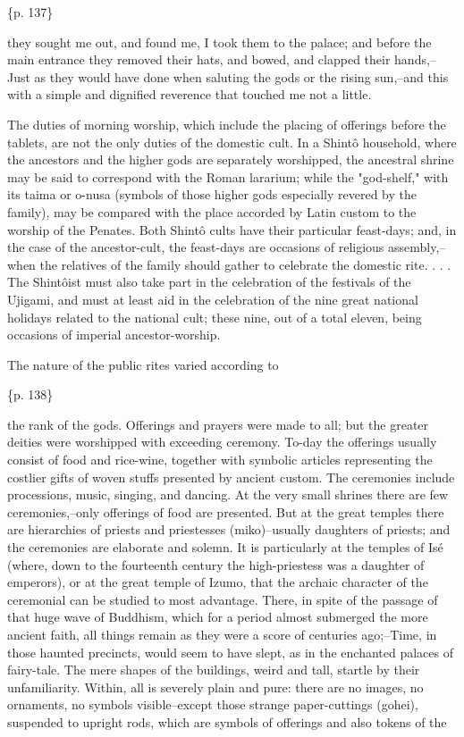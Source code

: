 \{p. 137\}

they sought me out, and found me, I took them to the palace; and before the main entrance they removed their hats, and bowed, and clapped their hands,--Just as they would have done when saluting the gods or the rising sun,--and this with a simple and dignified reverence that touched me not a little.



The duties of morning worship, which include the placing of offerings before the tablets, are not the only duties of the domestic cult. In a Shintô household, where the ancestors and the higher gods are separately worshipped, the ancestral shrine may be said to correspond with the Roman lararium; while the "god-shelf," with its taima or o-nusa (symbols of those higher gods especially revered by the family), may be compared with the place accorded by Latin custom to the worship of the Penates. Both Shintô cults have their particular feast-days; and, in the case of the ancestor-cult, the feast-days are occasions of religious assembly,--when the relatives of the family should gather to celebrate the domestic rite. . . . The Shintôist must also take part in the celebration of the festivals of the Ujigami, and must at least aid in the celebration of the nine great national holidays related to the national cult; these nine, out of a total eleven, being occasions of imperial ancestor-worship.

The nature of the public rites varied according to

\{p. 138\}

the rank of the gods. Offerings and prayers were made to all; but the greater deities were worshipped with exceeding ceremony. To-day the offerings usually consist of food and rice-wine, together with symbolic articles representing the costlier gifts of woven stuffs presented by ancient custom. The ceremonies include processions, music, singing, and dancing. At the very small shrines there are few ceremonies,--only offerings of food are presented. But at the great temples there are hierarchies of priests and priestesses (miko)--usually daughters of priests; and the ceremonies are elaborate and solemn. It is particularly at the temples of Isé (where, down to the fourteenth century the high-priestess was a daughter of emperors), or at the great temple of Izumo, that the archaic character of the ceremonial can be studied to most advantage. There, in spite of the passage of that huge wave of Buddhism, which for a period almost submerged the more ancient faith, all things remain as they were a score of centuries ago;--Time, in those haunted precincts, would seem to have slept, as in the enchanted palaces of fairy-tale. The mere shapes of the buildings, weird and tall, startle by their unfamiliarity. Within, all is severely plain and pure: there are no images, no ornaments, no symbols visible--except those strange paper-cuttings (gohei), suspended to upright rods, which are symbols of offerings and also tokens of the

